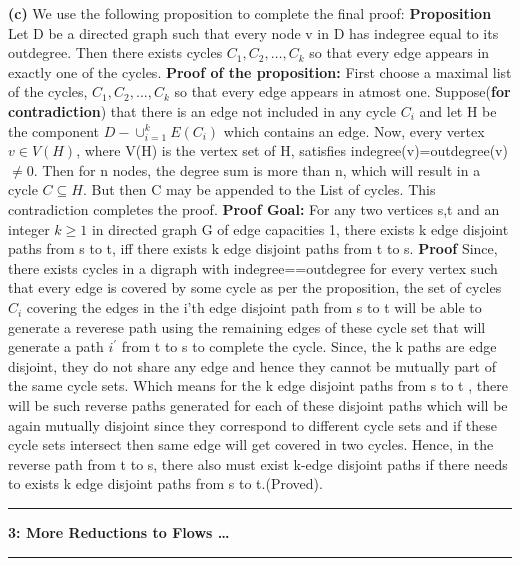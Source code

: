 \documentclass{article}
\newcommand\question[2]{\vspace{.25in}\hrule\textbf{#1: #2}\hrule\vspace{.10in}}
\renewcommand\part[1]{\vspace{.10in}\textbf{(#1)}}
\begin{document}
   \part{c} We use the following proposition to complete the final proof: \newline
   \textbf {Proposition} Let D be a directed graph such that every node v in D has indegree equal to its outdegree. Then there exists cycles $C_1, C_2, \dots, C_k$ so that every edge appears in exactly one of the cycles. \newline
   \textbf {Proof of the proposition:} First choose a maximal list of the cycles, $C_1,C_2,\dots,C_k$ so that every edge appears in atmost one. Suppose(\textbf {for contradiction}) that there is an edge not included in any cycle $C_i$ and let H be the component $D - \cup_{i=1}^kE(C_i)$ which contains an edge. Now, every vertex $v \in V(H)$, where V(H) is the vertex set of H, satisfies indegree(v)=outdegree(v)$\neq 0$. Then for n nodes, the degree sum is more than n, which will result in a cycle $C \subseteq H$. But then C may be appended to the List of cycles. This contradiction completes the proof. \newline
   \textbf {Proof Goal: } For any two vertices s,t and an integer $k \geq 1$ in directed graph G of edge capacities 1, there exists k edge disjoint paths from s to t, iff there exists k edge disjoint paths from t to s. \newline
   \textbf {Proof} Since, there exists cycles in a digraph with indegree==outdegree for every vertex such that every edge is covered by some cycle as per the proposition, the set of cycles $C_i$ covering the edges in the i'th edge disjoint path from s to t  will be able to generate a reverese path using the remaining edges of these cycle set that will generate a path $i^\prime$ from t to s to complete the cycle. Since, the k paths are edge disjoint, they do not share any edge and hence they cannot be mutually part of the same cycle sets. Which means for the k edge disjoint paths from s to t , there will be such reverse paths generated for each of these disjoint paths which will be again mutually disjoint since they correspond to different cycle sets and if these cycle sets intersect then same edge will get covered in two cycles. Hence, in the reverse path from t to s, there also must exist k-edge disjoint paths if there needs to exists k edge disjoint paths from s to t.(Proved). \newline


   \question{3}{More Reductions to Flows \dots}
\end{document}
